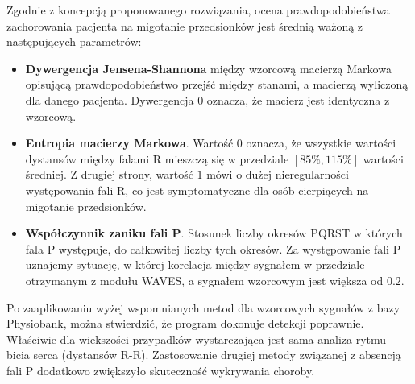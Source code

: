 Zgodnie z koncepcją proponowanego rozwiązania, ocena prawdopodobieństwa zachorowania pacjenta na migotanie przedsionków
jest średnią ważoną z następujących parametrów:
\begin{itemize}
 \item \textbf{Dywergencja Jensena-Shannona} między wzorcową macierzą Markowa opisującą prawdopodobieństwo przejść między stanami,
 a macierzą wyliczoną dla danego pacjenta. 
 Dywergencja $0$ oznacza, że macierz jest identyczna z wzorcową. 
 
 \item \textbf{Entropia macierzy Markowa}.
 Wartość $0$ oznacza, że wszystkie wartości dystansów między falami R mieszczą się w przedziale $[85\%,115\%]$ wartości średniej.
 Z drugiej strony, wartość $1$ mówi o dużej nieregularności występowania fali R, 
 co jest symptomatyczne dla osób cierpiących na migotanie przedsionków.
 
 \item \textbf{Współczynnik zaniku fali P}. 
 Stosunek liczby okresów PQRST w których fala P występuje, do całkowitej liczby tych okresów.
 Za występowanie fali P uznajemy sytuację, w której korelacja między sygnałem w przedziale otrzymanym z modułu WAVES,
 a sygnałem wzorcowym jest większa od $0.2$.
\end{itemize}
Po zaaplikowaniu wyżej wspomnianych metod dla wzorcowych sygnałów z bazy Physiobank, 
można stwierdzić, że program dokonuje detekcji poprawnie. 
Właściwie dla wiekszości przypadków wystarczająca jest sama analiza rytmu bicia serca (dystansów R-R).
Zastosowanie drugiej metody związanej z absencją fali P dodatkowo zwiększyło skuteczność wykrywania choroby.

